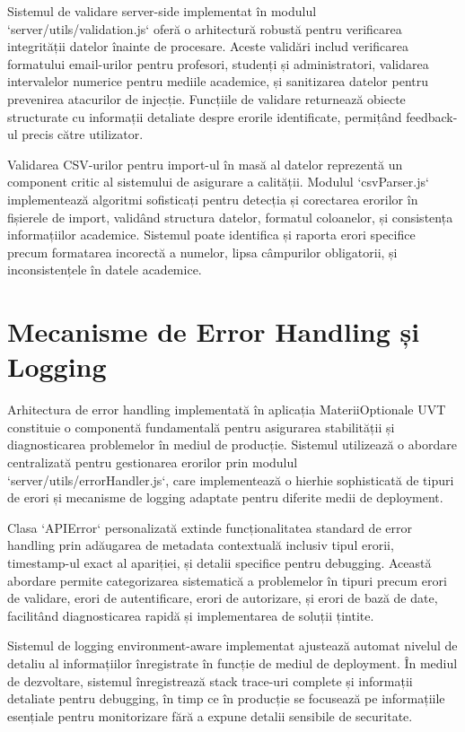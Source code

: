 \documentclass[12pt,a4paper]{report}
\begin{document}
Sistemul de validare server-side implementat în modulul `server/utils/validation.js` oferă o arhitectură robustă pentru verificarea integrității datelor înainte de procesare. Aceste validări includ verificarea formatului email-urilor pentru profesori, studenți și administratori, validarea intervalelor numerice pentru mediile academice, și sanitizarea datelor pentru prevenirea atacurilor de injecție. Funcțiile de validare returnează obiecte structurate cu informații detaliate despre erorile identificate, permițând feedback-ul precis către utilizator.

Validarea CSV-urilor pentru import-ul în masă al datelor reprezentă un component critic al sistemului de asigurare a calității. Modulul `csvParser.js` implementează algoritmi sofisticați pentru detecția și corectarea erorilor în fișierele de import, validând structura datelor, formatul coloanelor, și consistența informațiilor academice. Sistemul poate identifica și raporta erori specifice precum formatarea incorectă a numelor, lipsa câmpurilor obligatorii, și inconsistențele în datele academice.

\section{Mecanisme de Error Handling și Logging}

Arhitectura de error handling implementată în aplicația MateriiOptionale UVT constituie o componentă fundamentală pentru asigurarea stabilității și diagnosticarea problemelor în mediul de producție. Sistemul utilizează o abordare centralizată pentru gestionarea erorilor prin modulul `server/utils/errorHandler.js`, care implementează o hierhie sophisticată de tipuri de erori și mecanisme de logging adaptate pentru diferite medii de deployment.

Clasa `APIError` personalizată extinde funcționalitatea standard de error handling prin adăugarea de metadata contextuală inclusiv tipul erorii, timestamp-ul exact al apariției, și detalii specifice pentru debugging. Această abordare permite categorizarea sistematică a problemelor în tipuri precum erori de validare, erori de autentificare, erori de autorizare, și erori de bază de date, facilitând diagnosticarea rapidă și implementarea de soluții țintite.

Sistemul de logging environment-aware implementat ajustează automat nivelul de detaliu al informațiilor înregistrate în funcție de mediul de deployment. În mediul de dezvoltare, sistemul înregistrează stack trace-uri complete și informații detaliate pentru debugging, în timp ce în producție se focusează pe informațiile esențiale pentru monitorizare fără a expune detalii sensibile de securitate.
\end{document}
